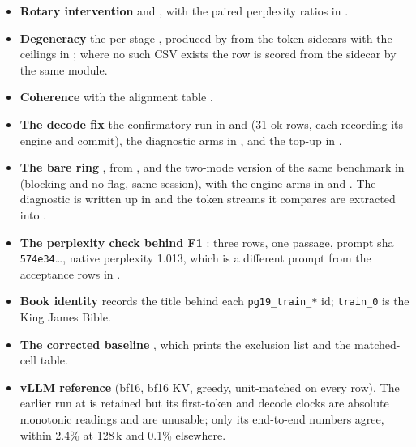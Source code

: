 \documentclass{article}
\begin{document}
\begin{itemize}[leftmargin=*,topsep=2pt,itemsep=1pt]
  \item \textbf{Rotary intervention} 
        and , with the paired
        perplexity ratios in .
  \item \textbf{Degeneracy} the per-stage , produced by
         from the token sidecars with the ceilings
        in ; where no such CSV exists the row is scored from
        the sidecar by the same module.
  \item \textbf{Coherence}  with the alignment table
        .
  \item \textbf{The decode fix} the confirmatory run in  and
         (31 ok rows, each recording its engine and commit), the diagnostic
        arms in , and the top-up in
        .
  \item \textbf{The bare ring} , from
        , and the two-mode version of the same
        benchmark in  (blocking and no-flag, same
        session), with the engine arms in  and
        . The diagnostic is written up in
         and the token streams it compares are
        extracted into .
  \item \textbf{The perplexity check behind F1} : three rows,
        one passage, prompt sha \texttt{574e34}\ldots, native perplexity 1.013, which is a
        different prompt from the acceptance rows in
        .
  \item \textbf{Book identity}  records the title
        behind each \texttt{pg19\_train\_*} id; \texttt{train\_0} is the King James Bible.
  \item \textbf{The corrected baseline} , which
        prints the exclusion list and the matched-cell table.
  \item \textbf{vLLM reference}  (bf16, bf16
        KV, greedy, unit-matched on every row). The earlier run at
         is retained but its first-token and decode clocks are
        absolute monotonic readings and are unusable; only its end-to-end numbers agree,
        within 2.4\% at 128\,k and 0.1\% elsewhere.
\end{itemize}
\end{document}

